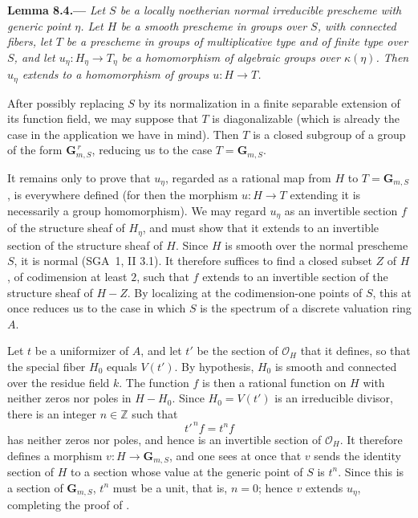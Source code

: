 \par\medskip\noindent{}\textbf{Lemma 8.4.---}\enspace
\emph{Let \(S\) be a locally noetherian normal irreducible prescheme with
generic point \(\eta\). Let \(H\) be a smooth prescheme in groups over
\(S\), with connected fibers, let \(T\) be a prescheme in groups of
multiplicative type and of finite type over \(S\), and let
\(u_\eta:H_\eta\to T_\eta\) be a homomorphism of algebraic groups over
\(\kappa(\eta)\). Then \(u_\eta\) extends to a homomorphism of groups
\(u:H\to T\).}

After possibly replacing \(S\) by its normalization in a finite separable
extension of its function field, we may suppose that \(T\) is
diagonalizable (which is already the case in the application we have in
mind). Then \(T\) is a closed subgroup of a group of the form
\(\mathbf{G}_{m,S}^{\,r}\), reducing us to the case
\(T=\mathbf{G}_{m,S}\).

It remains only to prove that \(u_\eta\), regarded as a rational map from
\(H\) to \(T=\mathbf{G}_{m,S}\), is everywhere defined (for then the
morphism \(u:H\to T\) extending it is necessarily a group homomorphism).
We may regard \(u_\eta\) as an invertible section \(f\) of the structure
sheaf of \(H_\eta\), and must show that it extends to an invertible section
of the structure sheaf of \(H\). Since \(H\) is smooth over the normal
prescheme \(S\), it is normal (SGA~1, II 3.1). It therefore suffices to
find a closed subset \(Z\) of \(H\), of codimension at least \(2\), such
that \(f\) extends to an invertible section of the structure sheaf of
\(H-Z\). By localizing at the codimension-one points of \(S\), this at
once reduces us to the case in which \(S\) is the spectrum of a discrete
valuation ring \(A\).

Let \(t\) be a uniformizer of \(A\), and let \(t'\) be the section of
\(\mathcal O_H\) that it defines, so that the special fiber \(H_0\) equals
\(V(t')\). By hypothesis, \(H_0\) is smooth and connected over the residue
field \(k\). The function \(f\) is then a rational function on \(H\) with
neither zeros nor poles in \(H-H_0\). Since \(H_0=V(t')\) is an
irreducible divisor, there is an integer \(n\in\mathbb{Z}\) such that
\[
  t'^{\,n}f=t^n f
\]
has neither zeros nor poles, and hence is an invertible section of
\(\mathcal O_H\). It therefore defines a morphism
\(v:H\to\mathbf{G}_{m,S}\), and one sees at once that \(v\) sends the
identity section of \(H\) to a section whose value at the generic point of
\(S\) is \(t^n\). Since this is a section of \(\mathbf{G}_{m,S}\), \(t^n\)
must be a unit, that is, \(n=0\); hence \(v\) extends \(u_\eta\),
completing the proof of .

